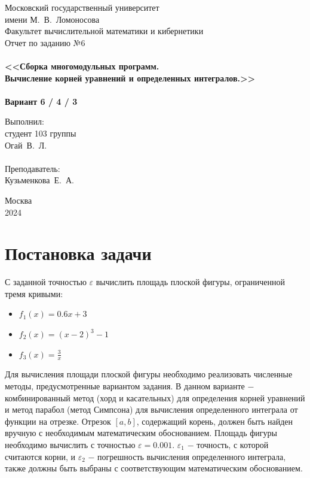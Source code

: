 \documentclass[a4paper,12pt,titlepage,finall]{article}
\begin{document}
\begin{titlepage}
    \begin{center}
	{\small \sc Московский государственный университет \\имени М.~В.~Ломоносова\\
	Факультет вычислительной математики и кибернетики\\}
	\vfill 
	{\Large \sc Отчет по заданию №6}\\
	~\\
	{\large \bf <<Сборка многомодульных программ. \\
	Вычисление корней уравнений и определенных интегралов.>>}\\ 
	~\\
	{\large \bf Вариант 6 / 4 / 3}
    \end{center}
    \begin{flushright}
	\vfill {Выполнил:\\
	студент 103 группы\\
	Огай~В.~Л.\\
	~\\
	Преподаватель:\\
	Кузьменкова~Е.~А.\\}
    \end{flushright}
    \begin{center}
	\vfill
	{\small Москва\\2024}
    \end{center}
\end{titlepage}

\tableofcontents
\newpage

\section{Постановка задачи}

С заданной точностью {$\varepsilon$} вычислить площадь плоской фигуры, ограниченной тремя кривыми: 
\begin{itemize}
\item[-]{$f_1(x) = 0.6{x} + 3$}
\item[-]{$f_2(x) = ({x} - 2)^3 - 1$}
\item[-]{$f_3(x) = \frac{3}{x}$}
\end{itemize}
Для вычисления площади плоской фигуры необходимо реализовать численные методы, предусмотренные вариантом задания. В данном варианте $-$ комбинированный метод (хорд и касательных) для определения корней уравнений и метод парабол (метод Симпсона) для вычисления определенного интеграла от функции на отрезке.
Отрезок  {$[a,b]$}, содержащий корень, должен быть найден вручную с необходимым математическим обоснованием. Площадь фигуры необходимо вычислить с точностью {$\varepsilon = 0.001$}. {$\varepsilon_1$} $-$ точность, с которой считаются корни, и {$\varepsilon_2$} $-$ погрешность вычисления определенного интеграла, также должны быть выбраны с соответствующим математическим обоснованием.
\end{document}
